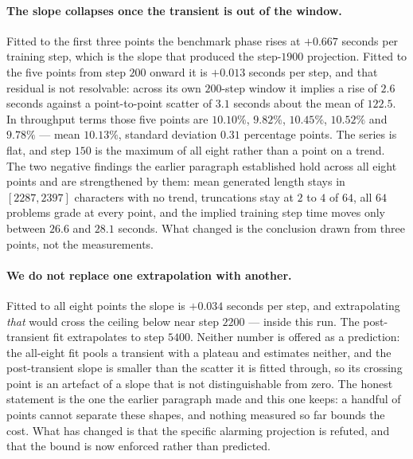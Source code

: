 \paragraph{The slope collapses once the transient is out of the window.} Fitted to the first
three points the benchmark phase rises at $+0.667$ seconds per training step, which is the
slope that produced the step-$1900$ projection. Fitted to the five points from step $200$
onward it is $+0.013$ seconds per step, and that residual is not resolvable: across its own
$200$-step window it implies a rise of $2.6$ seconds against a point-to-point scatter of $3.1$
seconds about the mean of $122.5$. In throughput terms those five points are $10.10\%$,
$9.82\%$, $10.45\%$, $10.52\%$ and $9.78\%$ --- mean $10.13\%$, standard deviation $0.31$
percentage points. The series is flat, and step $150$ is the maximum of all eight rather than a
point on a trend. The two negative findings the earlier paragraph established hold across all
eight points and are strengthened by them: mean generated length stays in $[2287, 2397]$
characters with no trend, truncations stay at $2$ to $4$ of $64$, all $64$ problems grade at
every point, and the implied training step time moves only between $26.6$ and $28.1$ seconds.
What changed is the conclusion drawn from three points, not the measurements.

\paragraph{We do not replace one extrapolation with another.} Fitted to all eight points the
slope is $+0.034$ seconds per step, and extrapolating \emph{that} would cross the ceiling
below near step $2200$ --- inside this run. The post-transient fit extrapolates to step
$5400$. Neither number is offered as a prediction: the all-eight fit pools a transient with a
plateau and estimates neither, and the post-transient slope is smaller than the scatter it is
fitted through, so its crossing point is an artefact of a slope that is not distinguishable
from zero. The honest statement is the one the earlier paragraph made and this one keeps: a
handful of points cannot separate these shapes, and nothing measured so far bounds the cost.
What has changed is that the specific alarming projection is refuted, and that the bound is
now enforced rather than predicted.

